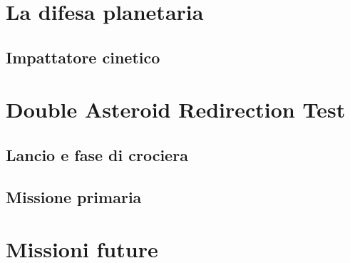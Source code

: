 \documentclass[a4paper,11pt,openright]{book}
\begin{document}
\section{La difesa planetaria}


\subsection{Impattatore cinetico}
\section{Double Asteroid Redirection Test}
\subsection{Lancio e fase di crociera}
\subsection{Missione primaria}
\section{Missioni future}
\end{document}
